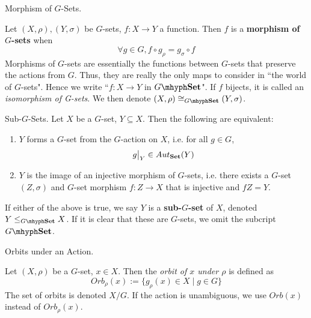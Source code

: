 \documentclass[../../book.tex]{subfiles}
\begin{document}
\begin{dfn} Morphism of $G$-Sets. 

    Let $(X,\rho), (Y,\sigma)$ be $G$-sets, $f : X \to Y$ a function. 
    Then $f$ is a \textbf{morphism of $G$-sets} when
    \[
        \forall g \in G, f \circ g_\rho = g_\sigma \circ f
    \]
    Morphisms of $G$-sets are essentially 
    the functions between $G$-sets that preserve the actions from $G$. 
    Thus, they are really the only maps to consider in ``the world of $G$-sets".
    Hence we write ``$f : X \to Y$ in $G\mhyph\Set$". 
    If $f$ bijects, it is called an \emph{isomorphism of G-sets}. 
    We then denote $(X,\rho) \iso_{G\mhyph\Set} (Y,\sigma)$. 
    
\end{dfn}


\begin{dfn} Sub-$G$-Sets.
    Let $X$ be a $G$-set, $Y \subseteq X$. 
    Then the following are equivalent: 
    \begin{enumerate}
        \item $Y$ forms a $G$-set from the $G$-action on $X$, 
        i.e. for all $g \in G$, \[\res{g}{Y} \in Aut_\Set(Y)\]
        \item $Y$ is the image of an injective morphism of $G$-sets, 
        i.e. there exists a $G$-set $(Z,\sigma)$ and $G$-set morphism $f : Z \to X$
        that is injective and $fZ = Y$. 
    \end{enumerate}
    If either of the above is true, 
    we say $Y$ is a \textbf{sub-$G$-set} of $X$,
    denoted $Y \leq_{G\mhyph\Set} X$. 
    If it is clear that these are $G$-sets, 
    we omit the subcript $G\mhyph\Set$.
    
\end{dfn}

\begin{dfn} Orbits under an Action. 

    Let $(X, \rho)$ be a $G$-set, $x \in X$. 
    Then the \emph{orbit of $x$ under $\rho$} is defined as
    \[
        Orb_\rho(x) := \{g_\rho(x) \in X \mid g \in G\}
    \]
    The set of orbits is denoted $X / G$.
    If the action is unambiguous, we use $Orb(x)$ instead of $Orb_\rho(x)$. 

\end{dfn}
\end{document}
